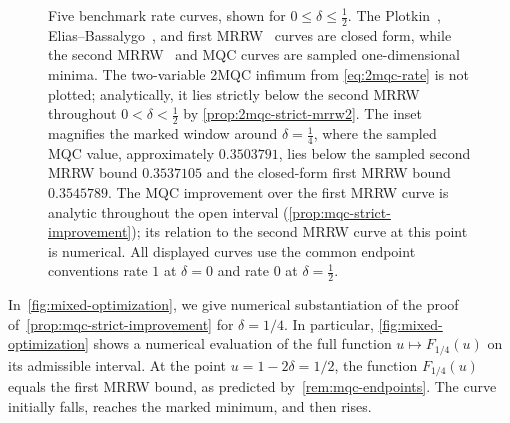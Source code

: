 \documentclass[11pt]{article}
\renewcommand{\leq}{\leqslant}
\theoremstyle{remark}
\begin{document}
\begin{figure}[!htbp]
\caption{Five benchmark rate curves, shown for $0 \leq \delta \leq \frac{1}{2}$. The Plotkin~\cite{Plo60}, Elias--Bassalygo~\cite{Eli55,Bas65}, and first MRRW~\cite{MRRW77} curves are closed form, while the second MRRW~\cite{MRRW77} and MQC curves are sampled one-dimensional minima. The two-variable 2MQC infimum from \eqref{eq:2mqc-rate} is not plotted; analytically, it lies strictly below the second MRRW throughout $0 < \delta < \frac{1}{2}$ by \cref{prop:2mqc-strict-mrrw2}. The inset magnifies the marked window around $\delta = \frac{1}{4}$, where the sampled MQC value, approximately $0.3503791$, lies below the sampled second MRRW bound $0.3537105$ and the closed-form first MRRW bound $0.3545789$. The MQC improvement over the first MRRW curve is analytic throughout the open interval (\cref{prop:mqc-strict-improvement}); its relation to the second MRRW curve at this point is numerical. All displayed curves use the common endpoint conventions rate $1$ at $\delta = 0$ and rate $0$ at $\delta = \frac{1}{2}$.}
\label{fig:mixed-versus-mrrw}
\end{figure}

In~\cref{fig:mixed-optimization}, we give numerical substantiation of the proof of~\cref{prop:mqc-strict-improvement} for $\delta = 1/4$. In particular, \cref{fig:mixed-optimization} shows a numerical evaluation of the full function $u \mapsto F_{1/4}(u)$ on its admissible interval. At the point $u = 1-2\delta = 1/2$, the function $F_{1/4}(u)$ equals the first MRRW bound, as predicted by~\cref{rem:mqc-endpoints}. The curve initially falls, reaches the marked minimum, and then rises.
\end{document}
